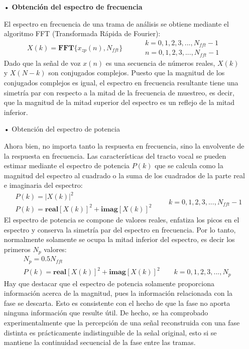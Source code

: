 \begin{enumerate}
\begin{enumerate}
\item[•]\textbf{Obtención del espectro de frecuencia}
\par
El espectro en frecuencia de una trama de análisis se obtiene mediante el algoritmo FFT (Transformada Rápida de Fourier):
\begin{equation}
\label{eq:ecuacion44}
X(k) = \mathbf{FFT}\{ x_{zp}(n), N_{fft} \}
\qquad
\begin{aligned}
& k = 0,1,2,3,...,N_{fft}-1 \\
& n = 0,1,2,3,...,N_{fft}-1
\end{aligned}
\end{equation}
Dado que la señal de voz $x(n)$ es una secuencia de números reales, $X(k)$ y $X(N - k)$ son conjugados complejos. Puesto que la magnitud de los conjugados complejos es igual, el espectro en frecuencia resultante tiene una simetría par con respecto a la mitad de la frecuencia de muestreo, es decir, que la magnitud de la mitad superior del espectro es un reflejo de la mitad inferior.

\item[•]Obtención del espectro de potencia
\par
Ahora bien, no importa tanto la respuesta en frecuencia, sino la envolvente de la respuesta en frecuencia. Las características del tracto vocal se pueden estimar mediante el espectro de potencia $P(k)$ que se calcula como la magnitud del espectro al cuadrado o la suma de los cuadrados de la parte real e imaginaria del espectro:
\begin{equation}
\label{eq:ecuacion45}
\begin{aligned}
& P(k) = \left | X(k) \right |^{2} \\
& P(k) = \mathbf{real}[X(k)]^{2} + \mathbf{imag}[X(k)]^{2}
\end{aligned}
\qquad
k = 0,1,2,3,...,N_{fft}-1
\end{equation}
El espectro de potencia se compone de valores reales, enfatiza los picos en el espectro y conserva la simetría par del espectro en frecuencia. Por lo tanto, normalmente solamente se ocupa la mitad inferior del espectro, es decir los primeros $N_{p}$ valores:
\begin{equation}
\label{eq:ecuacion46}
\begin{aligned}
& N_{p} = 0.5N_{fft} \\
& P(k) = \mathbf{real}[X(k)]^{2} + \mathbf{imag}[X(k)]^{2} \qquad k = 0,1,2,3,...,N_{p}
\end{aligned}
\end{equation}
Hay que destacar que el espectro de potencia solamente proporciona información acerca de la magnitud, pues la información relacionada con la fase se descarta. Esto es consistente con el hecho de que la fase no aporta ninguna información que resulte útil. De hecho, se ha comprobado experimentalmente que la percepción de una señal reconstruida con una fase distinta es prácticamente indistinguible de la señal original, esto si se mantiene la continuidad secuencial de la fase entre las tramas.


\end{enumerate}
\end{enumerate}
